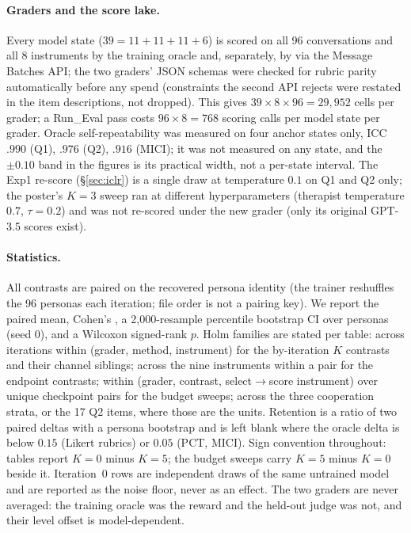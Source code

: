 \paragraph{Graders and the score lake.} Every model state ($39 = 11 + 11 + 11 + 6$) is scored on
all 96 conversations and all 8 instruments by the training oracle and, separately, by
\heldoutjudge{} via the Message Batches API; the two graders' JSON schemas were checked for
rubric parity automatically before any spend (constraints the second API rejects were restated in
the item descriptions, not dropped). This gives $39 \times 8 \times 96 = 29{,}952$ cells per
grader; a Run\_Eval pass costs $96 \times 8 = 768$ scoring calls per model state per grader.
Oracle self-repeatability was measured on four \Kz{} anchor states only, ICC $.990$ (Q1), $.976$
(Q2), $.916$ (MICI); it was not measured on any \Kf{} state, and the $\pm 0.10$ band in the figures
is its practical width, not a per-state interval. The Exp1 re-score (\S\ref{sec:iclr}) is a single
draw at temperature $0.1$ on Q1 and Q2 only; the poster's $K{=}3$ sweep ran at different
hyperparameters (therapist temperature $0.7$, $\tau{=}0.2$) and was not re-scored under the new
grader (only its original GPT-3.5 scores exist).

\paragraph{Statistics.} All contrasts are paired on the recovered persona identity (the trainer
reshuffles the 96 personas each iteration; file order is not a pairing key). We report the paired
mean, Cohen's \dz{}, a 2{,}000-resample percentile bootstrap CI over personas (seed 0), and a
Wilcoxon signed-rank $p$. Holm families are stated per table: across iterations within (grader,
method, instrument) for the by-iteration $K$ contrasts and their channel siblings; across the nine
instruments within a pair for the endpoint contrasts; within (grader, contrast, select$\to$score
instrument) over unique checkpoint pairs for the budget sweeps; across the three cooperation
strata, or the 17 Q2 items, where those are the units. Retention is a ratio of two paired deltas
with a persona bootstrap and is left blank where the oracle delta is below $0.15$ (Likert rubrics)
or $0.05$ (PCT, MICI). Sign convention throughout: tables report $K{=}0$ minus $K{=}5$; the budget
sweeps carry $K{=}5$ minus $K{=}0$ beside it. Iteration~0 rows are independent draws of the same
untrained model and are reported as the noise floor, never as an effect. The two graders are never
averaged: the training oracle was the reward and the held-out judge was not, and their level
offset is model-dependent.

